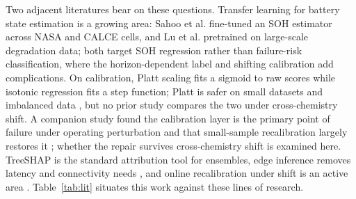\documentclass[preprint,12pt]{elsarticle}
\begin{document}
Two adjacent literatures bear on these questions. Transfer learning for battery state estimation is a growing area: Sahoo et al. \cite{sahoo2022transfer} fine-tuned an SOH estimator across NASA and CALCE cells, and Lu et al. \cite{lu2023deep} pretrained on large-scale degradation data; both target SOH regression rather than failure-risk classification, where the horizon-dependent label and shifting calibration add complications. On calibration, Platt scaling \cite{platt1999probabilistic} fits a sigmoid to raw scores while isotonic regression \cite{zadrozny2002transforming} fits a step function; Platt is safer on small datasets \cite{niculescu2005predicting} and imbalanced data \cite{huang2020experimental}, but no prior study compares the two under cross-chemistry shift. A companion study found the calibration layer is the primary point of failure under operating perturbation and that small-sample recalibration largely restores it \cite{shikdar2026robustness}; whether the repair survives cross-chemistry shift is examined here. TreeSHAP \cite{lundberg2020from} is the standard attribution tool for ensembles, edge inference removes latency and connectivity needs \cite{grzesik2024combining}, and online recalibration under shift is an active area \cite{gupta2023online}. Table~\ref{tab:lit} situates this work against these lines of research.
\end{document}
